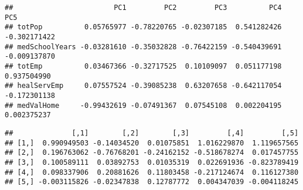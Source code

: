 \documentclass[
]{article}
\newenvironment{Shaded}{\begin{snugshade}}{\end{snugshade}}
\newcommand{\AttributeTok}[1]{\textcolor[rgb]{0.77,0.63,0.00}{#1}}
\newcommand{\CommentTok}[1]{\textcolor[rgb]{0.56,0.35,0.01}{\textit{#1}}}
\newcommand{\ControlFlowTok}[1]{\textcolor[rgb]{0.13,0.29,0.53}{\textbf{#1}}}
\newcommand{\DecValTok}[1]{\textcolor[rgb]{0.00,0.00,0.81}{#1}}
\newcommand{\FunctionTok}[1]{\textcolor[rgb]{0.00,0.00,0.00}{#1}}
\newcommand{\NormalTok}[1]{#1}
\newcommand{\OtherTok}[1]{\textcolor[rgb]{0.56,0.35,0.01}{#1}}
\newcommand{\SpecialCharTok}[1]{\textcolor[rgb]{0.00,0.00,0.00}{#1}}
\begin{document}
\begin{verbatim}
##                        PC1         PC2         PC3          PC4          PC5
## totPop          0.05765977 -0.78220765 -0.02307185  0.541282426 -0.302171422
## medSchoolYears -0.03281610 -0.35032828 -0.76422159 -0.540439691 -0.009137870
## totEmp          0.03467366 -0.32717525  0.10109097  0.051177198  0.937504990
## healServEmp     0.07557524 -0.39085238  0.63207658 -0.642117054 -0.172301138
## medValHome     -0.99432619 -0.07491367  0.07545108  0.002204195  0.002375237
\end{verbatim}

\begin{Shaded}
\end{Shaded}

\begin{verbatim}
##              [,1]        [,2]        [,3]         [,4]         [,5]
## [1,]  0.990949503 -0.14034520  0.01075851  1.016229870  1.119657565
## [2,]  0.196763062 -0.76768201 -0.24162152 -0.518678274  0.017457755
## [3,]  0.100589111  0.03892753  0.01035319  0.022691936 -0.823789419
## [4,]  0.098337906  0.20881626  0.11803458 -0.217124674  0.116127380
## [5,] -0.003115826 -0.02347838  0.12787772  0.004347039 -0.004118245
\end{verbatim}
\end{document}
